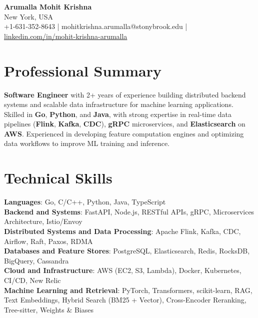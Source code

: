 \documentclass[letterpaper,11pt]{article}
\begin{document}
\begin{center}
  {\Large \textbf{Arumalla Mohit Krishna}} \\
  New York, USA \\
  +1-631-352-8643 \enspace | \enspace mohitkrishna.arumalla@stonybrook.edu \enspace | \enspace \href{https://www.linkedin.com/in/mohit-krishna-arumalla}{linkedin.com/in/mohit-krishna-arumalla}
\end{center}

\section{Professional Summary}
  \begin{itemize}[leftmargin=0.15in, label={}]
    \small{\item{
     \textbf{Software Engineer} with 2+ years of experience building distributed backend systems and scalable data infrastructure for machine learning applications. Skilled in \textbf{Go}, \textbf{Python}, and \textbf{Java}, with strong expertise in real-time data pipelines (\textbf{Flink}, \textbf{Kafka}, \textbf{CDC}), \textbf{gRPC} microservices, and \textbf{Elasticsearch} on \textbf{AWS}. Experienced in developing feature computation engines and optimizing data workflows to improve ML training and inference.
    }}
  \end{itemize}
\vspace{-16pt}

\section{Technical Skills}
 \begin{itemize}[leftmargin=0.15in, label={}]
    \small{\item{
     \textbf{Languages}: Go, C/C++, Python, Java, TypeScript \\
     \textbf{Backend and Systems}: FastAPI, Node.js, RESTful APIs, gRPC, Microservices Architecture, Istio/Envoy \\
     \textbf{Distributed Systems and Data Processing}: Apache Flink, Kafka, CDC, Airflow, Raft, Paxos, RDMA \\
     \textbf{Databases and Feature Stores}: PostgreSQL, Elasticsearch, Redis, RocksDB, BigQuery, Cassandra \\
     \textbf{Cloud and Infrastructure}: AWS (EC2, S3, Lambda), Docker, Kubernetes, CI/CD, New Relic \\
     \textbf{Machine Learning and Retrieval}: PyTorch, Transformers, scikit-learn, RAG, Text Embeddings, Hybrid Search (BM25 + Vector), Cross-Encoder Reranking, Tree-sitter, Weights \& Biases
    }}
 \end{itemize}
\vspace{-16pt}
\end{document}
